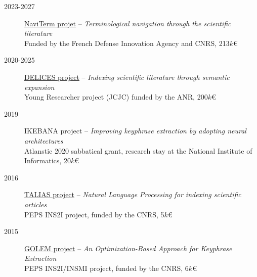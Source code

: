 \begin{description}

    \item[2023-2027] \href{https://cnrs-naviterm.github.io/}{NaviTerm projet} --
                    \emph{Terminological navigation through the scientific literature} \\
                    Funded by the French Defense Innovation Agency and CNRS, 213$k$€

    \item[2020-2025] \href{https://anr-delices.github.io/}{DELICES project} --
                    \emph{Indexing scientific literature through semantic expansion} \\
                    Young Researcher project (JCJC) funded by the ANR, 200$k$€

    \item[2019] IKEBANA project -- 
                \emph{Improving keyphrase extraction by adopting neural architectures} \\
                Atlanstic 2020 sabbatical grant, research stay at the National Institute of Informatics, 20$k$€

    \item[2016] \href{http://boudinfl.github.io/talias/}{TALIAS project} -- 
                \emph{Natural Language Processing for indexing scientific articles} \\
                PEPS INS2I project, funded by the CNRS, 5$k$€

    \item[2015] \href{http://boudinfl.github.io/golem/}{GOLEM project} -- 
                \emph{An Optimization-Based Approach for Keyphrase Extraction} \\
                PEPS INS2I/INSMI project, funded by the CNRS, 6$k$€
                
\end{description}
